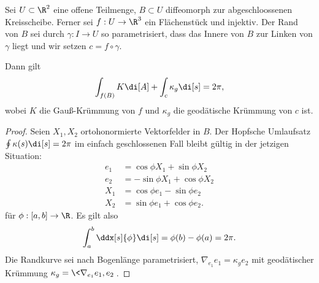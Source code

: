 \begin{thm}
	Sei $U \subset \R^2$ eine offene Teilmenge, $B \subset U$ diffeomorph zur abgeschloossenen Kreisscheibe.
	Ferner sei $f: U \to \R^3$ ein Flächenstück und injektiv.
	Der Rand von $B$ sei durch $\gamma: I \to U$ so parametrisiert, dass das Innere von $B$ zur Linken von $\gamma$ liegt und wir setzen $c = f \circ \gamma$.

	Dann gilt
	\[
		\int_{f(B)} K \di[A] + \int_c \kappa_g \di[s] = 2\pi,
	\]
	wobei $K$ die Gauß-Krümmung von $f$ und $\kappa_g$ die geodätische Krümmung von $c$ ist.
	\begin{proof}
		Seien $X_1, X_2$ ortohonormierte Vektorfelder in $B$.
		Der Hopfsche Umlaufsatz $\oint \kappa(s) \di[s] = 2\pi$ im einfach geschlossenen Fall bleibt gültig in der jetzigen Situation:
		\begin{align*}
			e_1 &= \cos \phi X_1 + \sin \phi X_2 \\
			e_2 &= -\sin \phi X_1 + \cos \phi X_2 \\
			X_1 &= \cos \phi e_1 - \sin \phi e_2 \\
			X_2 &= \sin \phi e_1 + \cos \phi e_2.
		\end{align*}
		für $\phi: [a,b] \to \R$.
		Es gilt also
		\[
			\int_a^b \ddx[s]{\phi} \di[s] = \phi(b) - \phi(a) = 2\pi.
		\]
		Die Randkurve sei nach Bogenlänge parametrisiert, $\nabla_{e_1} e_1 = \kappa_g e_2$ mit geodätischer Krümmung $\kappa_g = \<\nabla_{e_1} e_1, e_2\>$.


\end{proof}
\end{thm}
